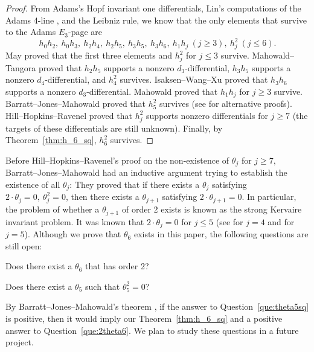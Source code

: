 \documentclass{amsart}
\numberwithin{equation}{section}
\begin{document}
\begin{proof}
    From Adams's Hopf invariant one differentials, Lin's computations of the Adams 4-line \cite{LinExt4}, and the Leibniz rule, we know that the only elements that survive to the Adams $E_3$-page are
    $$h_0h_2, \ h_0h_3, \ h_2h_4, \ h_2h_5, \ h_3h_5, \ h_3h_6, \ h_1h_j \ (j \geq 3), \ h_j^2 \ (j \leq 6).$$
May \cite{Maythesis} proved that the first three elements and $h_j^2$ for $j \leq 3$ survive. Mahowald--Tangora \cite{MahowaldTangora} proved that $h_2h_5$ supports a nonzero $d_3$-differential, $h_3h_5$ supports a nonzero $d_4$-differential, and $h_4^2$ survives. Isaksen--Wang--Xu \cite{IWX} proved that $h_3h_6$ supports a nonzero $d_3$-differential. Mahowald \cite{Mahowaldetaj} proved that $h_1h_j$ for $j \geq 3$ survive. Barratt--Jones--Mahowald \cite{BJMtheta5} proved that $h_5^2$ survives (see \cite{Xu, IWX} for alternative proofs). Hill--Hopkins--Ravenel \cite{HHR} proved that $h_j^2$ supports nonzero differentials for $j \geq 7$ (the targets of these differentials are still unknown). Finally, by Theorem~\ref{thm:h_6_sq}, $h_6^2$ survives.   
\end{proof}

Before Hill--Hopkins--Ravenel's proof on the non-existence of $\theta_j$ for $j \geq 7$, Barratt--Jones--Mahowald \cite{BJMinduction} had an inductive argument trying to establish the existence of all $\theta_j$: They proved that if there exists a $\theta_j$ satisfying $2\cdot \theta_j = 0, \ \theta_j^2 = 0$, then there exists a $\theta_{j+1}$ satisfying $2\cdot \theta_{j+1} = 0$. In particular, the problem of whether a $\theta_{j+1}$ of order 2 exists is known as the strong Kervaire invariant problem. It was known that $2\cdot \theta_j = 0$ for $j \leq 5$ (see \cite{MahowaldTangora} for $j=4$ and \cite{Xu, IWX} for $j=5$). Although we prove that $\theta_6$ exists in this paper, the following questions are still open:

\begin{question} \label{que:2theta6}
    Does there exist a $\theta_6$ that has order 2?
\end{question}

\begin{question} \label{que:theta5sq}
    Does there exist a $\theta_5$ such that $\theta_5^2 = 0$?
\end{question}

By Barratt--Jones--Mahowald's theorem \cite{BJMinduction}, if the answer to Question~\ref{que:theta5sq} is positive, then it would imply our Theorem~\ref{thm:h_6_sq} and a positive answer to Question~\ref{que:2theta6}. We plan to study these questions in a future project.\\
\end{document}
